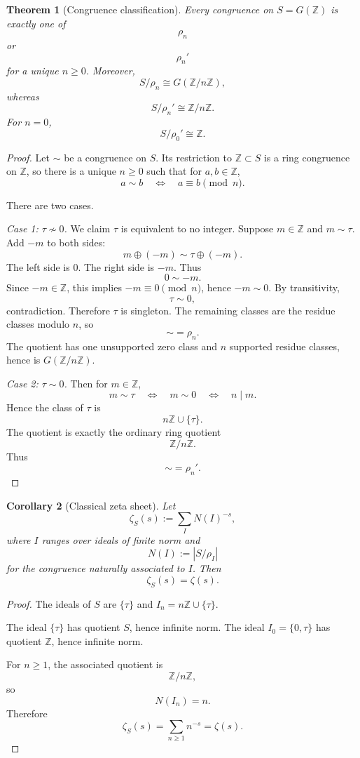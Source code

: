 \documentclass[11pt]{article}
\newtheorem{theorem}{Theorem}[section]
\newtheorem{corollary}[theorem]{Corollary}
\newcommand{\ZZ}{\mathbb Z}
\begin{document}
\begin{theorem}[Congruence classification]
Every congruence on \(S=G(\ZZ)\) is exactly one of
\[
\rho_n
\]
or
\[
\rho_n'
\]
for a unique \(n\ge0\). Moreover,
\[
S/\rho_n\cong G(\ZZ/n\ZZ),
\]
whereas
\[
S/\rho_n'\cong\ZZ/n\ZZ.
\]
For \(n=0\),
\[
S/\rho_0'\cong\ZZ.
\]
\end{theorem}

\begin{proof}
Let \(\sim\) be a congruence on \(S\). Its restriction to \(\ZZ\subset S\) is a ring congruence on \(\ZZ\), so there is a unique \(n\ge0\) such that for \(a,b\in\ZZ\),
\[
a\sim b
\quad\Longleftrightarrow\quad
a\equiv b\pmod n.
\]

There are two cases.

\emph{Case 1: \(\tau\not\sim0\).} We claim \(\tau\) is equivalent to no integer. Suppose \(m\in\ZZ\) and \(m\sim\tau\). Add \(-m\) to both sides:
\[
m\oplus(-m)\sim\tau\oplus(-m).
\]
The left side is \(0\). The right side is \(-m\). Thus
\[
0\sim -m.
\]
Since \(-m\in\ZZ\), this implies \(-m\equiv0\pmod n\), hence \(-m\sim0\). By transitivity,
\[
\tau\sim0,
\]
contradiction. Therefore \(\tau\) is singleton. The remaining classes are the residue classes modulo \(n\), so
\[
\sim=\rho_n.
\]
The quotient has one unsupported zero class and \(n\) supported residue classes, hence is \(G(\ZZ/n\ZZ)\).

\emph{Case 2: \(\tau\sim0\).} Then for \(m\in\ZZ\),
\[
m\sim\tau
\quad\Longleftrightarrow\quad
m\sim0
\quad\Longleftrightarrow\quad
n\mid m.
\]
Hence the class of \(\tau\) is
\[
n\ZZ\cup\{\tau\}.
\]
The quotient is exactly the ordinary ring quotient
\[
\ZZ/n\ZZ.
\]
Thus
\[
\sim=\rho_n'.
\]
\end{proof}

\begin{corollary}[Classical zeta sheet]
Let
\[
\zeta_S(s):=\sum_I N(I)^{-s},
\]
where \(I\) ranges over ideals of finite norm and
\[
N(I):=|S/\rho_I|
\]
for the congruence naturally associated to \(I\). Then
\[
\zeta_S(s)=\zeta(s).
\]
\end{corollary}

\begin{proof}
The ideals of \(S\) are \(\{\tau\}\) and \(I_n=n\ZZ\cup\{\tau\}\).

The ideal \(\{\tau\}\) has quotient \(S\), hence infinite norm. The ideal \(I_0=\{0,\tau\}\) has quotient \(\ZZ\), hence infinite norm.

For \(n\ge1\), the associated quotient is
\[
\ZZ/n\ZZ,
\]
so
\[
N(I_n)=n.
\]
Therefore
\[
\zeta_S(s)=\sum_{n\ge1}n^{-s}=\zeta(s).
\]
\end{proof}
\end{document}
